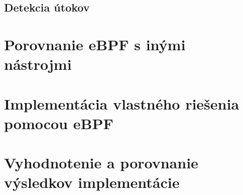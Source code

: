\subsection{Detekcia útokov}
\section{Porovnanie eBPF s inými nástrojmi}
\section{Implementácia vlastného riešenia pomocou eBPF}
\section{Vyhodnotenie a porovnanie výsledkov implementácie}















